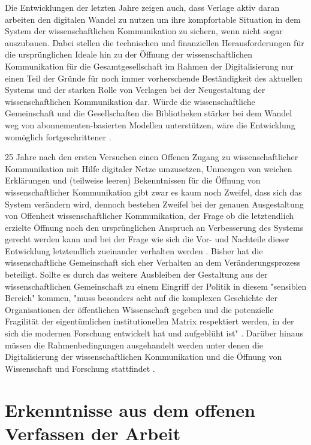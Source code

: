 Die Entwicklungen der letzten Jahre zeigen auch, dass Verlage aktiv daran arbeiten den digitalen Wandel zu nutzen um ihre kompfortable Situation in dem System der wissenschaftlichen Kommunikation zu sichern, wenn nicht sogar auszubauen. Dabei stellen die technischen und finanziellen Herausforderungen für die ursprünglichen Ideale hin zu der Öffnung der wissenschaftlichen Kommunikation für die Gesamtgesellschaft im Rahmen der Digitalisierung nur einen Teil der Gründe für noch immer vorherschende Beständigkeit des aktuellen Systems und der starken Rolle von Verlagen bei der Neugestaltung der wissenschaftlichen Kommunikation dar. Würde die wissenschaftliche Gemeinschaft und die Gesellschaften die Bibliotheken stärker bei dem Wandel weg von abonnementen-basierten Modellen unterstützen, wäre die Entwicklung womöglich fortgeschrittener \cite{nosek_2012_scientific}.

25 Jahre nach den ersten Versuchen einen Offenen Zugang zu wissenschaftlicher Kommunikation mit Hilfe digitaler Netze umzusetzen, Unmengen von weichen Erklärungen und (teilweise leeren) Bekenntnissen für die Öffnung von wissenschaftlicher Kommunikation gibt zwar es kaum noch Zweifel, dass sich das System verändern wird, dennoch bestehen Zweifel bei der genauen Ausgestaltung von Offenheit wissenschaftlicher Kommunikation, der Frage ob die letztendlich erzielte Öffnung noch den ursprünglichen Anspruch an Verbesserung des Systems gerecht werden kann und bei der Frage wie sich die Vor- und Nachteile dieser Entwicklung letztendlich zueinander verhalten werden \cite{hagner_2015_sache_buches}. Bisher hat die wissenschaftliche Gemeinschaft sich eher Verhalten an dem Veränderungsprozess beteiligt. Sollte es durch das weitere Ausbleiben der Gestaltung aus der wissenschaftlichen Gemeinschaft zu einem Eingriff der Politik in diesem "sensiblen Bereich" kommen, "muss besonders acht auf die komplexen Geschichte der Organisationen der öffentlichen Wissenschaft gegeben und die potenzielle Fragilität der eigentümlichen institutionellen Matrix respektiert werden, in der sich die modernen Forschung entwickelt hat und aufgeblüht ist" \cite{david1998_common}. Darüber hinaus müssen die Rahmenbedingungen ausgehandelt werden unter denen die Digitalisierung der wissenschaftlichen Kommunikation und die Öffnung von Wissenschaft und Forschung stattfindet \cite{mennes_2013_making_os}.

\section{Erkenntnisse aus dem offenen Verfassen der Arbeit}

